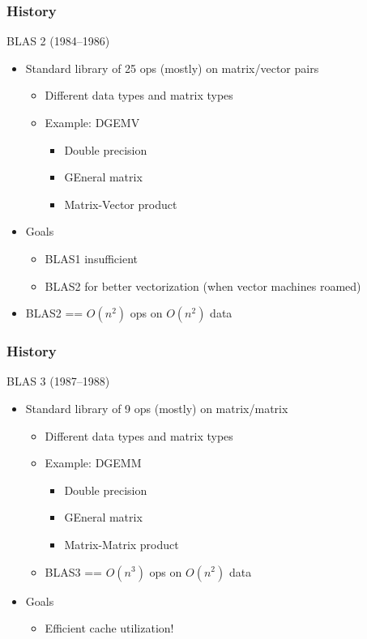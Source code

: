 \documentclass{beamer}
\begin{document}
\begin{frame}
  \frametitle{History}
  
  BLAS 2 (1984--1986)
  \begin{itemize}
  \item Standard library of 25 ops (mostly) on matrix/vector pairs
    \begin{itemize}
    \item Different data types and matrix types
    \item Example: DGEMV
      \begin{itemize}
      \item Double precision
      \item GEneral matrix
      \item Matrix-Vector product
      \end{itemize}
    \end{itemize}
  \item Goals
    \begin{itemize}
    \item BLAS1 insufficient
    \item BLAS2 for better vectorization (when vector machines roamed)
    \end{itemize}
  \item BLAS2 == $O(n^2)$ ops on $O(n^2)$ data
  \end{itemize}
\end{frame}


\begin{frame}
  \frametitle{History}

  BLAS 3 (1987--1988)
  \begin{itemize}
  \item Standard library of 9 ops (mostly) on matrix/matrix
    \begin{itemize}
    \item Different data types and matrix types
    \item Example: DGEMM
      \begin{itemize}
      \item Double precision
      \item GEneral matrix
      \item Matrix-Matrix product
      \end{itemize}
    \item BLAS3 == $O(n^3)$ ops on $O(n^2)$ data
    \end{itemize}
  \item Goals
    \begin{itemize}
    \item Efficient cache utilization!
    \end{itemize}
  \end{itemize}
\end{frame}
\end{document}
